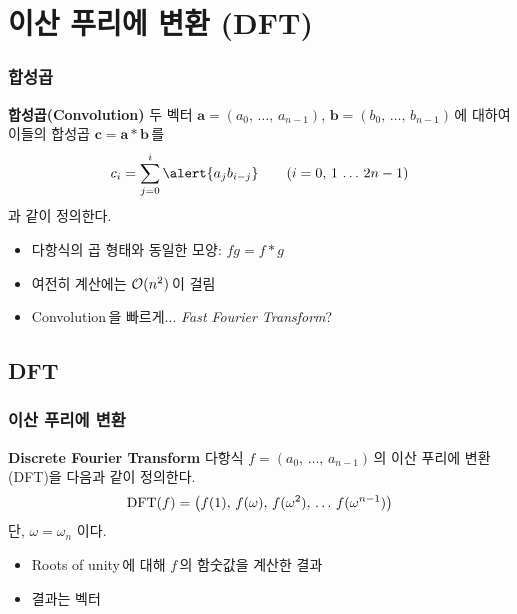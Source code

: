 \section{이산 푸리에 변환 (DFT)}

\begin{frame}
    \frametitle{합성곱}
    \begin{block}{\textbf{합성곱(Convolution)}}
        두 벡터 \(\mathbf{a} = \left(a_0,\,\dots,\,a_{n-1}\right)\), \(\mathbf{b} = \left(b_0,\,\dots,\,b_{n-1}\right)\)\,에 대하여 이들의 \alert{합성곱} \(\mathbf{c} = \mathbf{a} \ast \mathbf{b}\)\,를
        \[
            c_i = \sum_{j = 0}^{i} \alert{a_{j} b_{i - j}} \qquad (i = 0,\,1\,\dots\,2n - 1)
        \]
        과 같이 정의한다.
    \end{block}

    \pause

    \begin{itemize}
        \item<2-> 다항식의 곱 형태와 동일한 모양: \alert{\(fg = f \ast g\)}
        \item<3-> 여전히 계산에는 \(\mathcal{O}(n^2)\)\,이 걸림
        \item<4-> Convolution\,을 빠르게... \textit{Fast Fourier Transform}?
    \end{itemize}
\end{frame}

\subsection{DFT}

\begin{frame}
    \frametitle{이산 푸리에 변환}
    \begin{block}{\textbf{Discrete Fourier Transform}}
        다항식 \(f = \left(a_0,\,\dots,\,a_{n-1}\right)\)\,의 \alert{이산 푸리에 변환}(DFT)을 다음과 같이 정의한다.
        \[
            \mathrm{DFT}(f) = \big(f(1),\, f(\omega),\, f(\omega^2),\, \dots\, f(\omega^{n-1})\big)
        \]
        단, \(\omega = \omega_n\) 이다.
    \end{block}

    \pause

    \begin{itemize}
        \item<2-> Roots of unity\,에 대해 \(f\)\,의 함숫값을 계산한 결과
        \item<3-> 결과는 \alert{벡터}
    \end{itemize}
\end{frame}

